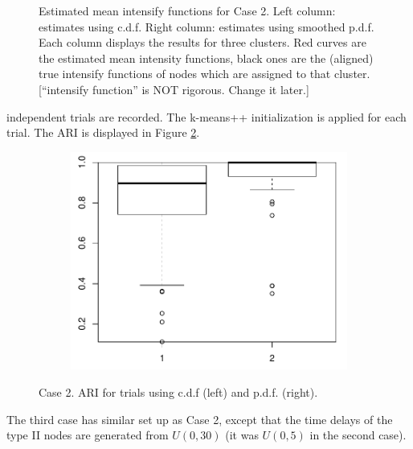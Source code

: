\begin{figure}[H]
\begin{minipage}{.49\textwidth}
\begin{subfigure}{\linewidth}
\end{subfigure}
\end{minipage}

\caption{Estimated mean intensify functions for Case 2. Left column: estimates using c.d.f. Right column: estimates using smoothed p.d.f.
Each column displays the results for three clusters.
Red curves are the estimated mean intensity functions, black ones are the (aligned) true intensify functions of nodes which are assigned to that cluster.
[``intensify function'' is NOT rigorous. Change it later.]
}
\label{fig: clustering result, case2}
\end{figure}


 independent trials are recorded. 
The k-means++ initialization is applied for each trial.
The ARI is displayed in Figure \ref{fig: ARI, case2}.

\begin{figure}[H]
\begin{subfigure}{.5\textwidth}
\includegraphics[width=\linewidth]{../simulation/plots/boxplot_cdf_vs_pdf_case2.pdf}
\end{subfigure}
\caption{Case 2. ARI for trials using c.d.f (left) and p.d.f. (right).
}
\label{fig: ARI, case2}
\end{figure}



The third case has similar set up as Case 2, except that 
the time delays of the type II nodes are generated from $U(0,30)$ (it was $U(0,5)$ in the second case).

